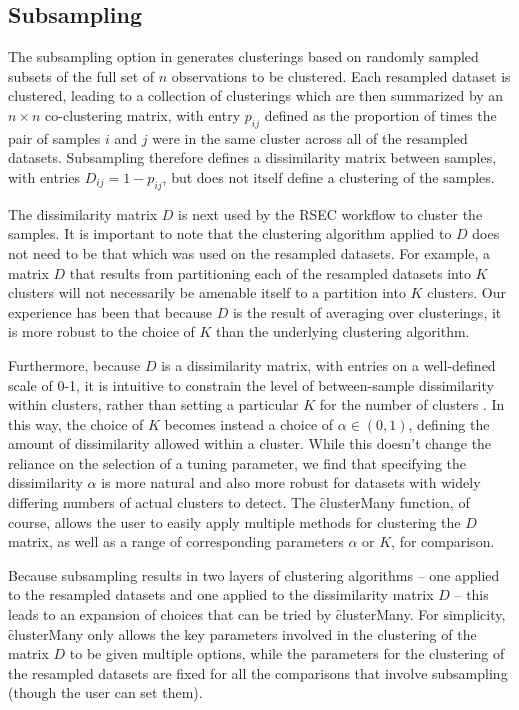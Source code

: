 \subsection{Subsampling}\label{supp:subsampling}

The subsampling option in \CE generates clusterings based on randomly sampled subsets of the full set of $n$ observations to be clustered. Each resampled dataset is clustered, leading to a collection of clusterings which are then summarized by an $n \times n$ co-clustering matrix, with entry $p_{ij}$ defined as the proportion of times the pair of samples $i$ and $j$ were in the same cluster across all of the resampled datasets. Subsampling therefore defines a dissimilarity matrix between samples, with entries $D_{ij}=1-p_{ij}$, but does not itself define a clustering of the samples.

The dissimilarity matrix $D$ is next used by the RSEC workflow to cluster the samples. It is important to note that the clustering algorithm applied to $D$ does not need to be that which was used on the resampled datasets. For example, a matrix $D$ that results from partitioning each of the resampled datasets into $K$ clusters will not necessarily be amenable itself to a partition into $K$ clusters. Our experience has been that because $D$ is the result of averaging over clusterings, it is more robust to the choice of $K$ than the underlying clustering algorithm. 

Furthermore, because $D$ is a dissimilarity matrix, with entries on a well-defined scale of 0-1, it is intuitive to constrain the level of between-sample dissimilarity within clusters, rather than setting a particular $K$ for the number of clusters \cite{Tseng:2005ir}. In this way, the choice of $K$ becomes instead a choice of $\alpha\in (0,1)$, defining the amount of dissimilarity allowed within a cluster. While this doesn't change the reliance on the selection of a tuning parameter, we find that specifying the dissimilarity $\alpha$ is more natural and also more robust for datasets with widely differing numbers of actual clusters to detect. The \f{clusterMany} function, of course, allows the user to easily apply multiple methods for clustering the $D$ matrix, as well as a range of corresponding parameters $\alpha$ or $K$, for comparison.

Because subsampling results in two layers of clustering algorithms -- one applied to the resampled datasets and one applied to the dissimilarity matrix $D$ -- this leads to an expansion of choices that can be tried by \f{clusterMany}. For simplicity, \f{clusterMany} only allows the key parameters involved in the clustering of the matrix $D$ to be given multiple options, while the parameters for the clustering of the resampled datasets are fixed for all the comparisons that involve subsampling (though the user can set them).


